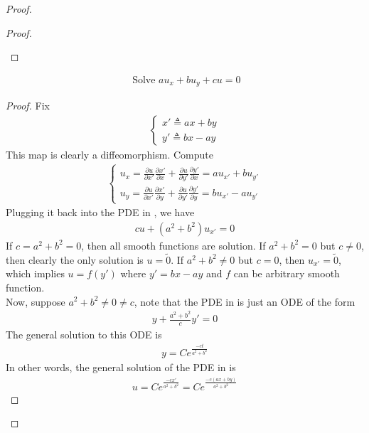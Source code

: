 \documentclass{report}
\begin{document}
\begin{proof}
\begin{proof}
\begin{center}
\begin{minipage}{0.9\linewidth}
   \end{minipage}
\end{center}
\end{proof}
\begin{theorem}
\begin{align}
\label{he2}
\text{ Solve }au_x+b u_y +cu=0
\end{align}
\end{theorem}
\begin{proof}
Fix 
\begin{align*}
\begin{cases}
  x'\triangleq ax+by \\
  y'\triangleq bx-ay
\end{cases}
\end{align*}
This map is clearly a diffeomorphism. Compute 
\begin{align*}
  \begin{cases}
    u_x= \frac{\partial u}{\partial x'}\frac{\partial x'}{\partial x}+\frac{\partial u}{\partial y'}\frac{\partial y'}{\partial x}=au_{x'}+bu_{y'}\\
    u_y=\frac{\partial u}{\partial x'}\frac{\partial x'}{\partial y}+\frac{\partial u}{\partial y'}\frac{\partial y'}{\partial y}=bu_{x'}-au_{y'}
  \end{cases}
\end{align*}
Plugging it back into the PDE in , we have 
\begin{align}
\label{he3}
cu+ (a^2+b^2)u_{x'}=0
\end{align}
If $c=a^2+b^2=0$, then all smooth functions are solution. If $a^2+b^2=0$ but $c\neq 0$, then clearly the only solution is $u=\tilde{0} $. If $a^2+b^2\neq 0$ but $c=0$, then $u_{x'}=\tilde{0}$, which implies $u=f(y')$ where $y'=bx-ay$ and  $f$ can be arbitrary smooth function.\\

Now, suppose $a^2+b^2\neq 0\neq c$, note that the PDE in  is just an ODE of the form 
\begin{align*}
y+\frac{a^2+b^2}{c}y'=0
\end{align*}
The general solution to this ODE is 
\begin{align*}
y=Ce^{\frac{-ct}{a^2+b^2}}
\end{align*}
In other words, the general solution of the PDE in  is 
\begin{align*}
u=C e^{\frac{-cx'}{a^2+b^2}}=Ce^{\frac{-c(ax+by)}{a^2+b^2}}
\end{align*}



\end{proof}
\end{proof}
\end{document}
